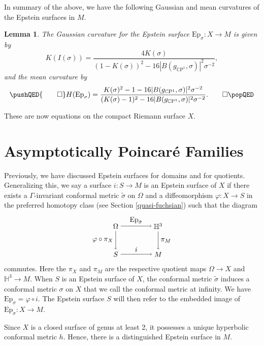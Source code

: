 \documentclass{amsart}
\newcommand{\CP}{\mathbb{C}\mathrm{P}}
\renewcommand{\H}{\mathbb{H}}
\newtheorem{lem}[thm]{Lemma}
\begin{document}
In summary of the above, we have the following Gaussian and mean curvatures of the Epstein surfaces in $M$.
\begin{lem}
\label{curvature-epstein}
The Gaussian curvature for the Epstein surface $\mathrm{Ep}_\sigma : X \to M$ is given by
\[
K(I(\sigma))
= \frac{4K(\sigma)}{(1-K(\sigma))^2 - 16 |B(g_{\CP^1},\sigma)|^2\sigma^{-2}},
\]
and the mean curvature by 
\[
\pushQED{\qed}
H(\mathrm{Ep}_\sigma)
= \frac{K(\sigma)^2 - 1 - 16 |B(g_{\CP^1},\sigma)|^2\sigma^{-2}}{(K(\sigma) - 1)^2 - 16 |B(g_{\CP^1},\sigma)|^2\sigma^{-2}}.
\qedhere
\popQED
\]
\end{lem}
These are now equations on the compact Riemann surface $X$.






\section{Asymptotically Poincar\'e Families} \label{main-results-chapter}




Previously, we have discussed Epstein surfaces for domains and for quotients. 
Generalizing this, we say a surface $i : S \to M$ is an Epstein surface of $X$ if there exists a $\Gamma$-invariant conformal metric $\tilde{\sigma}$ on $\Omega$ and a diffeomorphism $\varphi : X \to S$ in the preferred homotopy class (see Section \ref{quasi-fuchsian}) such that the diagram 
\[
\begin{tikzpicture}[scale=0.7]
\node (1) at (0,2) {$\Omega$};
\node (2) at (3,2) {$\H^3$};
\node (3) at (0,0) {$S$};
\node (4) at (3,0) {$M$};


\draw[->] (1) to node [above] {$\mathrm{Ep}_{\tilde{\sigma}}$} (2);
\draw[->] (1) to node [left] {$\varphi \circ \pi_X$} (3);
\draw[->] (3) to node [above] {$i$} (4);
\draw[->] (2) to node [right] {$\pi_M$} (4);

\end{tikzpicture}
\]
commutes. 
Here the $\pi_X$ and $\pi_M$ are the respective quotient maps $\Omega \to X$ and $\H^3 \to M$.
When $S$ is an Epstein surface of $X$, the conformal metric $\tilde{\sigma}$ induces a conformal metric $\sigma$ on $X$ that we call the conformal metric at infinity. 
We have $\mathrm{Ep}_{\sigma} = \varphi \circ i$. 
The Epstein surface $S$ will then refer to the embedded image of $\mathrm{Ep}_{\sigma}: X \to M$. 

Since $X$ is a closed surface of genus at least 2, it possesses a unique hyperbolic conformal metric $h$. 
Hence, there is a distinguished Epstein surface in $M$. 
\end{document}
